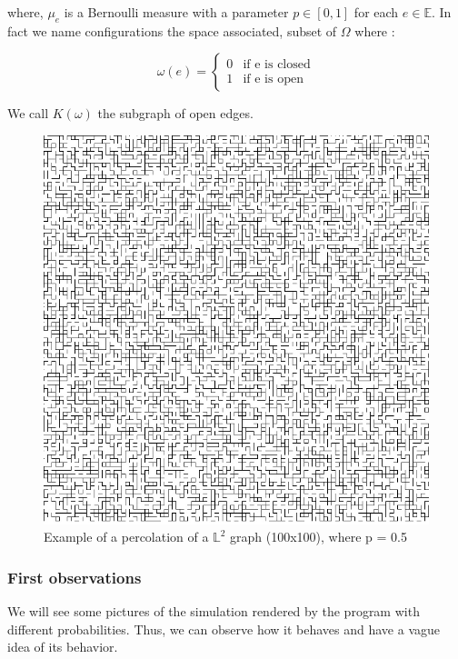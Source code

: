 \documentclass{article}
\begin{document}
where, $\mu_{e}$ is a Bernoulli measure with a parameter $p\in [0,1]$ for each $e\in\mathbb{E}$. In fact we name configurations the space associated, subset of $\Omega$ where :

$$
\omega(e) = \left\{
    \begin{array}{ll}
        0 & \mbox{if e is closed}\\
        1 & \mbox{if e is open}
    \end{array}
\right.
$$

We call $K(\omega)$ the subgraph of open edges.

\begin{figure}
\includegraphics[scale=0.75]{percolation0}
\centering

\caption{Example of a percolation of a $\mathbb{L}^2$ graph (100x100), where p = 0.5}
\end{figure}

\subsubsection{First observations}

We will see some pictures of the simulation rendered by the program with different probabilities. Thus, we can observe how it behaves and have a vague idea of its behavior. \\
\end{document}
